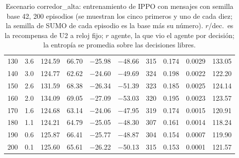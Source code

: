 \begin{table}[H]
\begin{tabular}{rrrrrrrrrr}
130 & 3.6 & 124.59 & 66.70 & $-$25.98 & $-$48.66 & 315 & 0.174 & 0.0029 & 133.05 \\
140 & 3.0 & 124.77 & 62.62 & $-$24.60 & $-$49.69 & 324 & 0.198 & 0.0022 & 122.20 \\
150 & 2.6 & 131.59 & 68.38 & $-$26.34 & $-$51.39 & 323 & 0.185 & 0.0025 & 124.14 \\
160 & 2.0 & 134.09 & 69.05 & $-$27.09 & $-$53.03 & 320 & 0.195 & 0.0023 & 123.57 \\
170 & 1.6 & 124.68 & 63.14 & $-$24.06 & $-$47.95 & 319 & 0.174 & 0.0015 & 120.91 \\
180 & 1.1 & 124.21 & 64.79 & $-$25.05 & $-$48.30 & 307 & 0.161 & 0.0014 & 118.24 \\
190 & 0.6 & 125.87 & 66.41 & $-$25.77 & $-$48.87 & 304 & 0.154 & 0.0007 & 119.90 \\
200 & 0.1 & 125.60 & 65.61 & $-$26.22 & $-$50.13 & 315 & 0.153 & 0.0001 & 121.57 \\
\bottomrule
\end{tabular}
\caption[Escenario corredor\_alta: entrenamiento de IPPO con mensajes, semilla base 42]{Escenario corredor\_alta: entrenamiento de IPPO con mensajes con semilla base 42, 200 episodios (se muestran los cinco primeros y uno de cada diez; la semilla de SUMO de cada episodio es la base más su número). $r$/dec.\ es la recompensa de U2 a reloj fijo; $r$ agente, la que vio el agente por decisión; la entropía se promedia sobre las decisiones libres.}
\label{tab:corredor_alta-ippo-vecinos-42}
\end{table}

